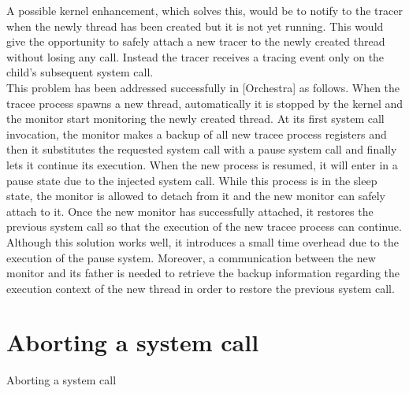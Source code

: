 A possible kernel enhancement, which solves this, would be to notify to the tracer when the newly thread has been created but it is not yet running. This would give the opportunity to safely attach a new tracer to the newly created thread without losing any call. Instead the tracer receives a tracing event only on the child’s subsequent system call.\\
This problem has been addressed successfully in [Orchestra] as follows.  When the tracee process spawns a new thread, automatically it is stopped by the kernel and the monitor start monitoring the newly created thread. At its first system call invocation, the monitor makes a backup of all new tracee process registers and then it substitutes the requested system call with a pause system call and finally lets it continue its execution.  When the new process is resumed, it will enter in a pause state due to the injected system call. While this process is in the sleep state, the monitor is allowed to detach from it and the new monitor can safely attach to it. Once the new monitor has successfully attached, it restores the previous system call so that the execution of the new tracee process can continue. Although this solution works well, it introduces a small time overhead due to the execution of the pause system.  Moreover, a communication between the new monitor and its father is needed to retrieve the backup information regarding the execution context of the new thread in order to restore the previous system call. \\

\section{Aborting a system call}
Aborting a system call

